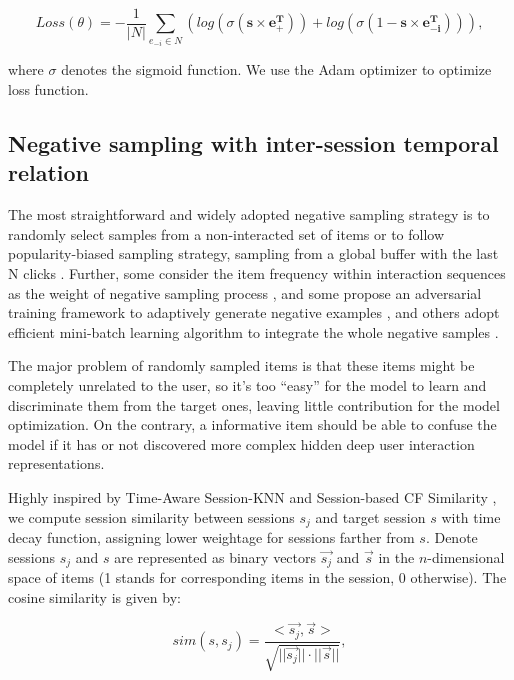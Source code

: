 \begin{equation}
    Loss(\theta) = - \frac{1}{|N|}\sum_{e_{-i}\in N} \left(log(\sigma(\mathbf{s}\times \mathbf{e_{+}^{T}})) + log(\sigma(1-\mathbf{s}\times \mathbf{e_{-i}^{T}}))\right),
\end{equation}

where $\sigma$ denotes the sigmoid function. We use the Adam optimizer to optimize loss function. 

\subsection{Negative sampling with inter-session temporal relation}
\label{sec:3.3}
The most straightforward and widely adopted negative sampling strategy is to randomly select samples from a non-interacted set of items or to follow popularity-biased sampling strategy, sampling from a global buffer with the last N clicks \cite{moreira_news_2018}. Further, some consider the item frequency within interaction sequences as the weight of negative sampling process \cite{li_learning_2018}, and some propose an adversarial training framework to adaptively generate negative examples \cite{wang_neural_2018}, and others adopt efficient mini-batch learning algorithm to  integrate the whole negative samples \cite{chen2020efficient}.

The major problem of randomly sampled items is that these items might be completely unrelated to the user, so it's too ``easy'' for the model
to learn and discriminate them from the target ones, leaving little contribution for the model optimization. On the contrary, a informative item should be able to confuse the model if it has or not discovered more complex hidden deep user interaction representations.

Highly inspired by Time-Aware Session-KNN \cite{garg2019sequence} and Session-based CF Similarity \cite{sottocornola2018session}, we compute session similarity between sessions $s_j$ and target session $s$ with time decay function, assigning lower weightage for sessions farther from $s$. Denote sessions $s_j$ and $s$ are represented as binary vectors $\vec{s_j}$ and $\vec{s}$ in the $n$-dimensional space of items (1 stands for corresponding items in the session, 0 otherwise). The cosine similarity is given by:

\begin{equation}
    sim(s, s_j) = \frac{<\vec{s_j}, \vec{s}>}{\sqrt{||\vec{s_j}|| \cdot ||\vec{s}||}},
\end{equation}

